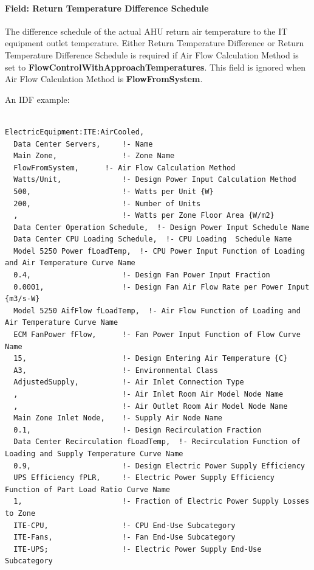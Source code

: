 \paragraph{Field: Return Temperature Difference Schedule}\label{field-return-temperature-difference-schedule}

The difference schedule of the actual AHU return air temperature to the IT equipment outlet temperature. Either Return Temperature Difference or Return Temperature Difference Schedule is required if Air Flow Calculation Method is set to \textbf{FlowControlWithApproachTemperatures}. This field is ignored when Air Flow Calculation Method is \textbf{FlowFromSystem}.

An IDF example:

\begin{lstlisting}

ElectricEquipment:ITE:AirCooled,
  Data Center Servers,     !- Name
  Main Zone,               !- Zone Name
  FlowFromSystem,      !- Air Flow Calculation Method
  Watts/Unit,              !- Design Power Input Calculation Method
  500,                     !- Watts per Unit {W}
  200,                     !- Number of Units
  ,                        !- Watts per Zone Floor Area {W/m2}
  Data Center Operation Schedule,  !- Design Power Input Schedule Name
  Data Center CPU Loading Schedule,  !- CPU Loading  Schedule Name
  Model 5250 Power fLoadTemp,  !- CPU Power Input Function of Loading and Air Temperature Curve Name
  0.4,                     !- Design Fan Power Input Fraction
  0.0001,                  !- Design Fan Air Flow Rate per Power Input {m3/s-W}
  Model 5250 AifFlow fLoadTemp,  !- Air Flow Function of Loading and Air Temperature Curve Name
  ECM FanPower fFlow,      !- Fan Power Input Function of Flow Curve Name
  15,                      !- Design Entering Air Temperature {C}
  A3,                      !- Environmental Class
  AdjustedSupply,          !- Air Inlet Connection Type
  ,                        !- Air Inlet Room Air Model Node Name
  ,                        !- Air Outlet Room Air Model Node Name
  Main Zone Inlet Node,    !- Supply Air Node Name
  0.1,                     !- Design Recirculation Fraction
  Data Center Recirculation fLoadTemp,  !- Recirculation Function of Loading and Supply Temperature Curve Name
  0.9,                     !- Design Electric Power Supply Efficiency
  UPS Efficiency fPLR,     !- Electric Power Supply Efficiency Function of Part Load Ratio Curve Name
  1,                       !- Fraction of Electric Power Supply Losses to Zone
  ITE-CPU,                 !- CPU End-Use Subcategory
  ITE-Fans,                !- Fan End-Use Subcategory
  ITE-UPS;                 !- Electric Power Supply End-Use Subcategory
\end{lstlisting}

